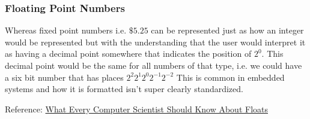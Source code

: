 \documentclass[../notes.tex]{subfiles}
\begin{document}
\subsubsection{Floating Point Numbers}


Whereas fixed point numbers i.e. $ \$5.25 $ can be represented just as how an integer would be represented but with the understanding that the user would interpret it as having a decimal point somewhere that indicates the position of $ 2^0 $.
This decimal point would be the same for all numbers of that type, i.e. we could have a six bit number that has places $ 2^2 2^1 2^0 2^{-1} 2^{-2} $ 
This is common in embedded systems and how it is formatted isn't super clearly standardized.

\begin{lemma}
	Reference: \href{https://www.eecg.utoronto.ca/~moshovos/ECE352-2022/00.practice/What\%20Every\%20Computer\%20Scientist\%20Should\%20Know\%20About\%20Floating-Point\%20Arithmetic.htm}{What Every Computer Scientist Should Know About Floats}
\end{lemma}
\end{document}
